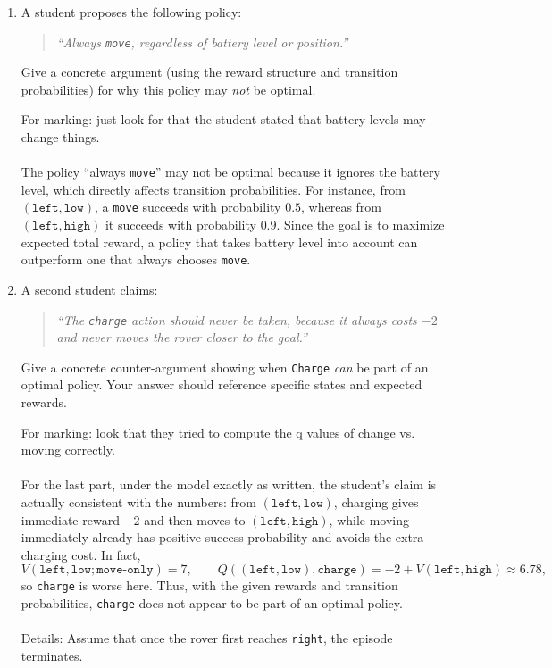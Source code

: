 \begin{enumerate}
\item \points[2] A student proposes the following policy:
\begin{quote}
  \emph{``Always \texttt{move}, regardless of battery level or position.''}
\end{quote}
Give a concrete argument (using the reward structure and transition probabilities) for why
this policy may \emph{not} be optimal.
\begin{solution}
For marking: just look for that the student stated that battery levels may change things.
\\~\\
The policy ``always \texttt{move}'' may not be optimal because it ignores the battery level, which directly affects transition probabilities. For instance, from $(\texttt{left},\texttt{low})$, a \texttt{move} succeeds with probability $0.5$, whereas from $(\texttt{left},\texttt{high})$ it succeeds with probability $0.9$. Since the goal is to maximize expected total reward, a policy that takes battery level into account can outperform one that always chooses \texttt{move}.
\end{solution}

\item \points[2] A second student claims:
\begin{quote}
  \emph{``The \texttt{charge} action should never be taken, because it always costs $-2$
  and never moves the rover closer to the goal.''}
\end{quote}
Give a concrete counter-argument showing when \texttt{Charge} \emph{can} be
part of an optimal policy.  Your answer should reference specific states and expected
rewards.
\begin{solution}
For marking: look that they tried to compute the q values of change vs. moving correctly.
\\~\\
For the last part, under the model exactly as written, the student’s claim is actually consistent with the numbers: from $(\texttt{left},\texttt{low})$, charging gives immediate reward $-2$ and then moves to $(\texttt{left},\texttt{high})$, while moving immediately already has positive success probability and avoids the extra charging cost. In fact,
\[
V(\texttt{left},\texttt{low};\texttt{move-only}) = 7,
\qquad
Q((\texttt{left},\texttt{low}),\texttt{charge}) = -2 + V(\texttt{left},\texttt{high}) \approx 6.78,
\]
so \texttt{charge} is worse here. Thus, with the given rewards and transition probabilities, \texttt{charge} does not appear to be part of an optimal policy.
\\~\\
Details:
Assume that once the rover first reaches \texttt{right}, the episode terminates.


\end{solution}
\end{enumerate}
